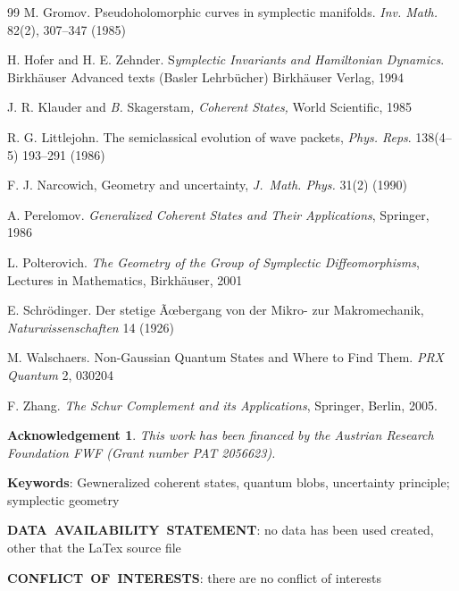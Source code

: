 \documentclass[11pt]{article}%
\newtheorem{acknowledgement}[theorem]{Acknowledgement}
\begin{document}
\begin{thebibliography}{99}
M. Gromov. Pseudoholomorphic curves in symplectic manifolds.
\textit{Inv. Math.} 82(2), 307--347 (1985)

H. Hofer and H. E. Zehnder. S\textit{ymplectic Invariants and
Hamiltonian Dynamics}. Birkh\"{a}user Advanced texts (Basler Lehrb\"{u}cher)
Birkh\"{a}user Verlag, 1994

J. R. Klauder and \textit{B. }Skagerstam\textit{, Coherent
States,} World Scientific, 1985

R. G. Littlejohn. The semiclassical evolution of wave
packets, \textit{Phys. Reps}. 138(4--5) 193--291 (1986)

F. J. Narcowich, Geometry and uncertainty, \textit{J.\ Math.
Phys.} 31(2) (1990)

A. Perelomov. \textit{Generalized Coherent States and Their
Applications}, Springer, 1986

L. Polterovich. \textit{The Geometry of the Group of
Symplectic Diffeomorphisms}, Lectures in Mathematics, Birkh\"{a}user, 2001

E. Schr\"{o}dinger. Der stetige \~{A}\oe bergang von der
Mikro- zur Makromechanik, \textit{Naturwissenschaften }14\textit{ }(1926)

M. Walschaers. Non-Gaussian Quantum States and Where to Find
Them. \textit{PRX Quantum} 2, 030204

F. Zhang. \textit{The Schur Complement and its Applications},
Springer, Berlin, 2005.%
\[
\]

\end{thebibliography}

\begin{acknowledgement}
This work has been financed by the Austrian Research Foundation FWF (Grant
number PAT 2056623).
\end{acknowledgement}

\textbf{Keywords}: Gewneralized coherent states, quantum blobs, uncertainty
principle; symplectic geometry

\textbf{DATA\ AVAILABILITY\ STATEMENT}: no data has been used created, other
that the LaTex source file

\textbf{CONFLICT\ OF\ INTERESTS}: there are no conflict of interests
\end{document}
